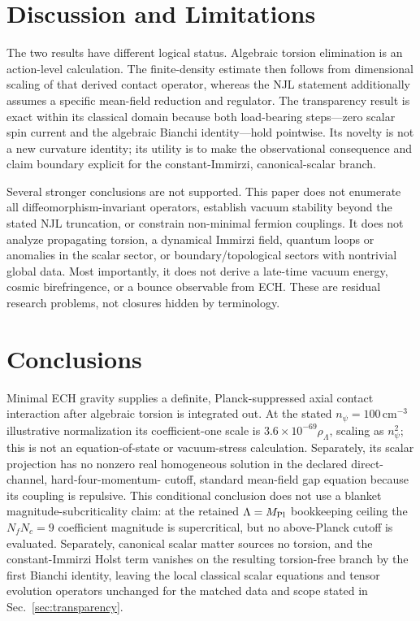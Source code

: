 \documentclass[aps,prd,twocolumn,superscriptaddress,showpacs,preprintnumbers,nofootinbib,longbibliography,floatfix]{revtex4-2}
\begin{document}
\section{Discussion and Limitations}\label{sec:discussion}

The two results have different logical status.  Algebraic torsion elimination
is an action-level calculation.  The finite-density estimate then follows
from dimensional scaling of that derived contact operator, whereas the NJL
statement additionally assumes a specific mean-field reduction and regulator.
The transparency result is exact within its classical domain because both
load-bearing steps---zero scalar spin current and the algebraic Bianchi
identity---hold pointwise.  Its novelty is not a new curvature identity; its
utility is to make the observational consequence and claim boundary explicit
for the constant-Immirzi, canonical-scalar branch.

Several stronger conclusions are not supported.  This paper does not
enumerate all diffeomorphism-invariant operators, establish vacuum stability
beyond the stated NJL truncation, or constrain non-minimal fermion couplings.
It does not analyze propagating torsion, a dynamical Immirzi field, quantum
loops or anomalies in the scalar sector, or boundary/topological sectors with
nontrivial global data.  Most importantly, it does not derive a late-time
vacuum energy, cosmic birefringence, or a bounce observable from ECH.  These
are residual research problems, not closures hidden by terminology.

\section{Conclusions}\label{sec:conclusions}

Minimal ECH gravity supplies a definite, Planck-suppressed axial contact
interaction after algebraic torsion is integrated out.  At the stated
$n_\psi=100\,\mathrm{cm}^{-3}$ illustrative normalization its coefficient-one
scale is $3.6\times10^{-69}\rho_\Lambda$, scaling as $n_\psi^2$; this is not an
equation-of-state or vacuum-stress calculation.  Separately, its scalar projection has no nonzero
real homogeneous solution in the declared direct-channel, hard-four-momentum-
cutoff, standard mean-field gap equation because its coupling is repulsive.
This conditional conclusion does not use a blanket magnitude-subcriticality
claim: at the retained $\Lambda=M_{\rm Pl}$ bookkeeping ceiling the
$N_fN_c=9$ coefficient magnitude is supercritical, but no above-Planck cutoff
is evaluated.  Separately, canonical
scalar matter sources no torsion, and the constant-Immirzi Holst term vanishes
on the resulting torsion-free branch by the first Bianchi identity, leaving
the local classical scalar equations and tensor evolution operators unchanged
for the matched data and scope stated in Sec.~\ref{sec:transparency}.
\end{document}
